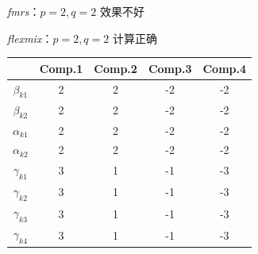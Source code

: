 \documentclass[12pt, a4paper, oneside]{article}
\numberwithin{equation}{section}
\begin{document}
\textit{fmrs}：$p=2,q=2$ 效果不好

\textit{flexmix}：$p=2,q=2$ 计算正确

\begin{table}[h]
	\centering
	\begin{tabular}{ccccc}
		\toprule
		& Comp.1 & Comp.2 & Comp.3 & Comp.4 \\
		\midrule
		$\beta_{k1}$   & 2      & 2      & -2     & -2     \\
		$\beta_{k2}$   & 2      & 2      & -2     & -2     \\
		\midrule
		$\alpha_{k1}$  & 2      & 2      & -2     & -2     \\
		$\alpha_{k2}$  & 2      & 2      & -2     & -2     \\
		\midrule
		$\gamma_{k1}$  & 3      & 1      & -1     & -3     \\
		$\gamma_{k2}$  & 3      & 1      & -1     & -3     \\
		$\gamma_{k3}$  & 3      & 1      & -1     & -3     \\
		$\gamma_{k4}$  & 3      & 1      & -1     & -3     \\
		\bottomrule
	\end{tabular}
	\label{tb:coef_true_nonzero}
\end{table}
\end{document}
